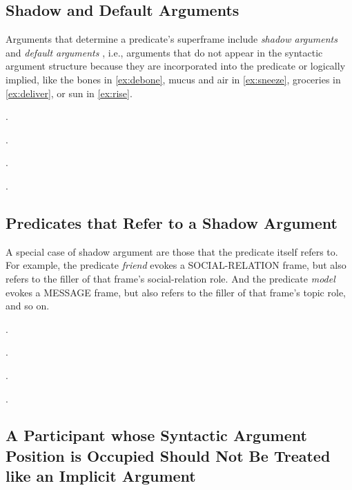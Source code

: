 \documentclass[a4paper]{article}
\newcommand{\fr}[1]{\textsf{#1}}
\newcommand{\rl}[1]{\textsf{#1}}
\begin{document}
\newpage\subsection{Shadow and Default Arguments}

Arguments that determine a predicate's superframe include \emph{shadow
arguments} and \emph{default arguments}
\citep{pustejovsky-1995-generative,di-fabio-etal-2019-verbatlas}, i.e.,
arguments that do not appear in the syntactic argument structure because they
are incorporated into the predicate or logically implied, like the bones in
\ref{ex:debone}, mucus and air in \ref{ex:sneeze}, groceries in
\ref{ex:deliver}, or sun in \ref{ex:rise}.

\ex.\label{ex:debone}

\ex.\label{ex:sneeze}

\ex.\label{ex:deliver}

\ex.\label{ex:rise}

\newpage\subsection{Predicates that Refer to a Shadow Argument}

A special case of shadow argument are those that the predicate itself refers
to. For example, the predicate \emph{friend} evokes a \fr{SOCIAL-RELATION}
frame, but also refers to the filler of that frame's \rl{social-relation} role.
And the predicate \emph{model} evokes a \fr{MESSAGE} frame, but also refers to
the filler of that frame's \rl{topic} role, and so on.

\ex.

\ex.

\ex.

\ex.

\newpage\subsection{A Participant whose Syntactic Argument Position is Occupied Should Not Be Treated like an Implicit Argument}
\end{document}
